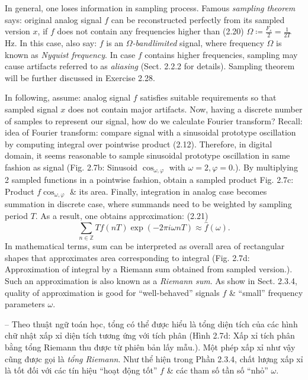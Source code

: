 \documentclass{article}
\begin{document}
\begin{itemize}
\begin{itemize}
\begin{itemize}
			In general, one loses information in sampling process. Famous {\it sampling theorem} says: original analog signal $f$ can be reconstructed perfectly from its sampled version $x$, if $f$ does not contain any frequencies higher than (2.20) $\Omega\coloneqq\frac{F_s}{2} = \frac{1}{2T}$ Hz. In this case, also say: $f$ is an {\it$\Omega$-bandlimited} signal, where frequency $\Omega$ is known as {\it Nyquist frequency}. In case $f$ contains higher frequencies, sampling may cause artifacts referred to as {\it aliasing} (Sect. 2.2.2 for details). Sampling theorem will be further discussed in Exercise 2.28.
			
			In following, assume: analog signal $f$ satisfies suitable requirements so that sampled signal $x$ does not contain major artifacts. Now, having a discrete number of samples to represent our signal, how do we calculate Fourier transform? Recall: idea of Fourier transform: compare signal with a sinusoidal prototype oscillation by computing integral over pointwise product (2.12). Therefore, in digital domain, it seems reasonable to sample sinusoidal prototype oscillation in same fashion as signal ({\sf Fig. 2.7b: Sinusoid $\cos_{\omega,\varphi}$ with $\omega = 2,\varphi = 0$.}). By multiplying 2 sampled functions in a pointwise fashion, obtain a sampled product {\sf Fig. 2.7c: Product $f\cos_{\omega,\varphi}$ \& its area.} Finally, integration in analog case becomes summation in discrete case, where summands need to be weighted by sampling period $T$. As a result, one obtains approximation: (2.21)
			\begin{equation*}
				\sum_{n\in\mathbb{Z}} Tf(nT)\exp(-2\pi i\omega nT)\approx\hat{f}(\omega).
			\end{equation*}
			In mathematical terms, sum can be interpreted as overall area of rectangular shapes that approximates area corresponding to integral ({\sf Fig. 2.7d: Approximation of integral by a Riemann sum obtained from sampled version.}). Such an approximation is also known as a {\it Riemann sum}. As show in Sect. 2.3.4, quality of approximation is good for ``well-behaved'' signals $f$ \& ``small'' frequency parameters $\omega$.
			
			-- Theo thuật ngữ toán học, tổng có thể được hiểu là tổng diện tích của các hình chữ nhật xấp xỉ diện tích tương ứng với tích phân ({\sf Hình 2.7d: Xấp xỉ tích phân bằng tổng Riemann thu được từ phiên bản lấy mẫu.}). Một phép xấp xỉ như vậy cũng được gọi là {\it tổng Riemann}. Như thể hiện trong Phần 2.3.4, chất lượng xấp xỉ là tốt đối với các tín hiệu ``hoạt động tốt'' $f$ \& các tham số tần số ``nhỏ'' $\omega$.
			

\end{itemize}
\end{itemize}
\end{itemize}
\end{document}

